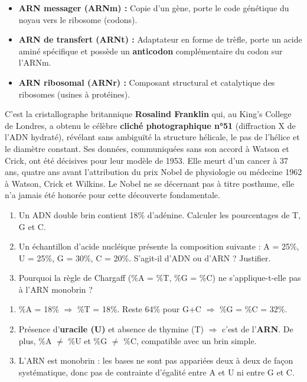 \documentclass[11pt]{article}
\begin{document}
\begin{definition}
\begin{itemize}
    \item \textbf{ARN messager (ARNm) :} Copie d'un gène, porte le code génétique du noyau vers le ribosome (codons).
    \item \textbf{ARN de transfert (ARNt) :} Adaptateur en forme de trèfle, porte un acide aminé spécifique et possède un \textbf{anticodon} complémentaire du codon sur l'ARNm.
    \item \textbf{ARN ribosomal (ARNr) :} Composant structural et catalytique des ribosomes (usines à protéines).
\end{itemize}
\end{definition}

\begin{savaistu}
C'est la cristallographe britannique \textbf{Rosalind Franklin} qui, au King's College de Londres, a obtenu le célèbre \textbf{cliché photographique n°51} (diffraction X de l'ADN hydraté), révélant sans ambiguïté la structure hélicale, le pas de l'hélice et le diamètre constant. Ses données, communiquées sans son accord à Watson et Crick, ont été décisives pour leur modèle de 1953. Elle meurt d'un cancer à 37 ans, quatre ans avant l'attribution du prix Nobel de physiologie ou médecine 1962 à Watson, Crick et Wilkins. Le Nobel ne se décernant pas à titre posthume, elle n'a jamais été honorée pour cette découverte fondamentale.
\end{savaistu}

\begin{exercice}
\begin{enumerate}
    \item Un ADN double brin contient 18\% d'adénine. Calculer les pourcentages de T, G et C.
    \item Un échantillon d'acide nucléique présente la composition suivante : A = 25\%, U = 25\%, G = 30\%, C = 20\%. S'agit-il d'ADN ou d'ARN ? Justifier.
    \item Pourquoi la règle de Chargaff (\%A = \%T, \%G = \%C) ne s'applique-t-elle pas à l'ARN monobrin ?
\end{enumerate}
\end{exercice}

\begin{corrige}[Exercice n]
\begin{enumerate}
    \item \%A = 18\% $\Rightarrow$ \%T = 18\%. Reste 64\% pour G+C $\Rightarrow$ \%G = \%C = 32\%.
    \item Présence d'\textbf{uracile (U)} et absence de thymine (T) $\Rightarrow$ c'est de l'\textbf{ARN}. De plus, \%A $\neq$ \%U et \%G $\neq$ \%C, compatible avec un brin simple.
    \item L'ARN est monobrin : les bases ne sont pas appariées deux à deux de façon systématique, donc pas de contrainte d'égalité entre A et U ni entre G et C.
\end{enumerate}
\end{corrige}
\end{document}
